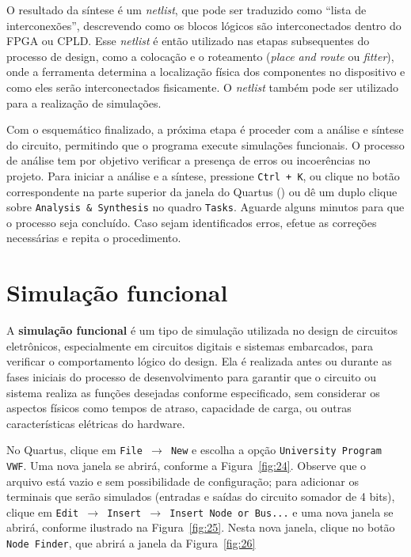 \documentclass[12pt,a4paper]{article}
\begin{document}
O resultado da síntese é um \textit{netlist}, que pode ser traduzido como ``lista de interconexões'', descrevendo como os blocos lógicos são interconectados dentro do FPGA ou CPLD. Esse \textit{netlist} é então utilizado nas etapas subsequentes do processo de design, como a colocação e o roteamento (\textit{place and route} ou \textit{fitter}), onde a ferramenta determina a localização física dos componentes no dispositivo e como eles serão interconectados fisicamente. O \textit{netlist} também pode ser utilizado para a realização de simulações.

Com o esquemático finalizado, a próxima etapa é proceder com a análise e síntese do circuito, permitindo que o programa execute simulações funcionais. O processo de análise tem por objetivo verificar a presença de erros ou incoerências no projeto. Para iniciar a análise e a síntese, pressione \texttt{Ctrl + K}, ou clique no botão correspondente na parte superior da janela do Quartus () ou dê um duplo clique sobre \texttt{Analysis \& Synthesis} no quadro \texttt{Tasks}. Aguarde alguns minutos para que o processo seja concluído. Caso sejam identificados erros, efetue as correções necessárias e repita o procedimento.

\section{Simulação funcional}

A \textbf{simulação funcional} é um tipo de simulação utilizada no design de circuitos eletrônicos, especialmente em circuitos digitais e sistemas embarcados, para verificar o comportamento lógico do design. Ela é realizada antes ou durante as fases iniciais do processo de desenvolvimento para garantir que o circuito ou sistema realiza as funções desejadas conforme especificado, sem considerar os aspectos físicos como tempos de atraso, capacidade de carga, ou outras características elétricas do hardware.

No Quartus, clique em \texttt{File $\rightarrow$ New} e escolha a opção \texttt{University Program VWF}. Uma nova janela se abrirá, conforme a Figura~\ref{fig:24}. Observe que o arquivo está vazio e sem possibilidade de configuração; para adicionar os terminais que serão simulados (entradas e saídas do circuito somador de 4 bits), clique em \texttt{Edit $\rightarrow$ Insert $\rightarrow$ Insert Node or Bus...} e uma nova janela se abrirá, conforme ilustrado na Figura~\ref{fig:25}. Nesta nova janela, clique no botão \texttt{Node Finder}, que abrirá a janela da Figura~\ref{fig:26}
\end{document}

